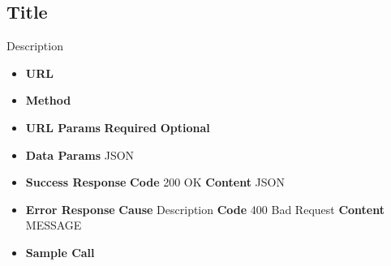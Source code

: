 \subsection{Title}
Description

\begin{itemize}
\item \textbf{URL} 
\item \textbf{Method} 

\item \textbf{URL Params}
  \newline\textbf{Required} 
  \newline\textbf{Optional} 

\item \textbf{Data Params} JSON

\item \textbf{Success Response}
  \newline\textbf{Code} 200 OK
  \newline\textbf{Content} JSON

\item \textbf{Error Response}
  \newline\textbf{Cause} Description
  \newline\textbf{Code} 400 Bad Request
  \newline\textbf{Content} MESSAGE

\item \textbf{Sample Call}
\end{itemize}
